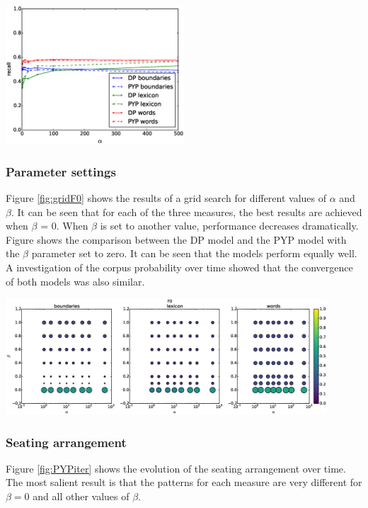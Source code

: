 \begingroup
    \centering
    \includegraphics[width=0.5\textwidth]{images/DP-vs-PYP-recall}
    \label{fig:PYPvsDP}
\endgroup

\subsubsection{Parameter settings}
Figure \ref{fig:gridF0} shows the results of a grid search for different values of $\alpha$ and $\beta$. It can be seen that for each of the three measures, the best results are achieved when $\beta$ = 0. When $\beta$ is set to another value, performance decreases dramatically.
Figure  shows the comparison between the DP model and the PYP model with the $\beta$ parameter set to zero. It can be seen that the models perform equally well. A investigation of the corpus probability over time showed that the convergence of both models was also similar.

\begingroup
    \centering
    \includegraphics[width=0.9\textwidth]{images/PYP-F0}
    \label{fig:gridF0}
\endgroup

\subsubsection{Seating arrangement}
Figure \ref{fig:PYPiter} shows the evolution of the seating arrangement over time.
The most salient result is that the patterns for each measure are very different for $\beta=0$ and all other values of $\beta$.

